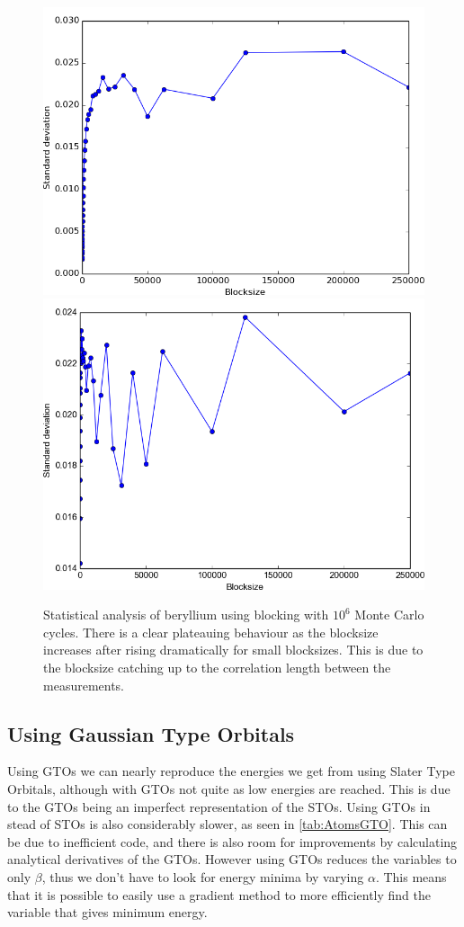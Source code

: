 		\begin{figure}
			\centering \includegraphics[width=0.49\linewidth]{content/Results/figures/Beryllium_blocking}
			\centering \includegraphics[width=0.49\linewidth]{content/Results/figures/Neon_blocking}
			\protect\caption{Statistical analysis of beryllium using blocking with $10^6$ Monte Carlo cycles. There is a clear plateauing behaviour as the blocksize increases after rising dramatically for small blocksizes. This is due to the blocksize catching up to the correlation length between the measurements. }\label{fig01:std_Stuff}
		\end{figure}



	\subsection{Using Gaussian Type Orbitals}
		Using GTOs we can nearly reproduce the energies we get
                from using Slater Type Orbitals, although with GTOs
                not quite as low energies are reached. This is due to
                the GTOs being an imperfect representation of the
                STOs. Using GTOs in stead of STOs is also considerably
                slower, as seen in \ref{tab:AtomsGTO}. This can be due
                to inefficient code, and there is also room for
                improvements by calculating analytical derivatives of
                the GTOs. However using GTOs reduces the variables to
                only $\beta$, thus we don't have to look for energy
                minima by varying $\alpha$. This means that it is
                possible to easily use a gradient method to more
                efficiently find the variable that gives minimum
                energy.

